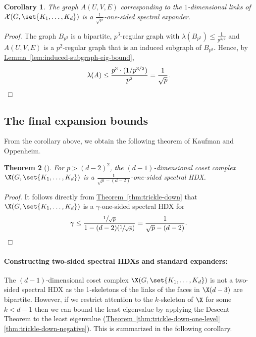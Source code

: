 \documentclass[11pt]{article}
\newcommand{\expref}[2]{\texorpdfstring{\hyperref[#2]{#1~\ref{#2}}}{#1~\ref{#2}}}
\newtheorem{theorem}{Theorem}[section]
\newtheorem{corollary}[theorem]{Corollary}
\begin{document}
\begin{corollary}
  The graph $A(U,V,E)$ corresponding to the $1$-dimensional links of $\mathcal{X}(G,\set{K_1,\ldots, K_d})$ is a $\frac{1}{\sqrt{p}}$-one-sided spectral expander. 
\end{corollary}
\begin{proof}
  The graph $B_{p^3}$ is a bipartite, $p^3$-regular graph with $\lambda(B_{p^3}) \leq \frac{1}{p^{3/2}}$ and $A(U,V,E)$ is a $p^2$-regular graph that is an induced subgraph of $B_{p^3}$. Hence, by \expref{Lemma}{lem:induced-subgraph-eig-bound},
  \[
\lambda(A) \leq \frac{p^3 \cdot (1/p^{3/2})}{p^2} = \frac{1}{\sqrt{p}}. \qedhere
  \]
\end{proof}

\subsection*{The final expansion bounds}

From the corollary above, we obtain the following theorem of Kaufman and 
Oppenheim.


\begin{theorem}[\cite{KaufmanO2018}]\label{thm:KO-HDX} For $p > (d-2)^2$, 
  the $(d-1)$-dimensional coset complex $\X(G,\set{K_1,\ldots,K_d})$
  is a $\frac1{\sqrt{p}-(d-2)}$-one-sided spectral HDX.
\end{theorem}



\begin{proof}
%
It follows  %
directly from \expref{Theorem}{thm:trickle-down} that
  $\X(G,\set{K_1,\ldots,K_d})$ is a $\gamma$-one-sided spectral HDX for
  \[
  \gamma \leq \frac{\sfrac{1}{\sqrt{p}}}{1 - (d-2)(\sfrac{1}{\sqrt{p}})} = \frac{1}{\sqrt{p} - (d-2)}.\qedhere
  \]
\end{proof}


\paragraph{Constructing two-sided spectral HDXs and standard expanders:}

The $(d-1)$-dimensional coset complex $\X(G,\set{K_1,\ldots,K_d})$ is
not a two-sided spectral HDX as the 1-skeletons of the links of the faces in
$\X(d-3)$ are bipartite. However, if we restrict attention to the $k$-skeleton of
$\X$ for some $k<d-1$ then we can bound the least eigenvalue
%
by applying the Descent Theorem to the least eigenvalue %
(\expref{Theorem}{thm:trickle-down-one-level}\eqref{thm:trickle-down-negative}).
This is summarized in the following corollary. 
\end{document}
